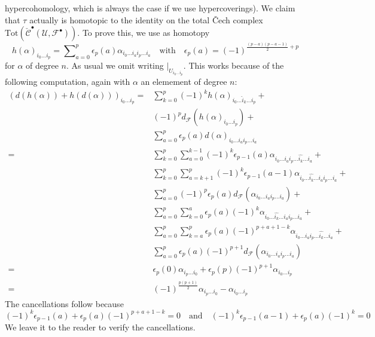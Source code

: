 hypercohomology, which is always the case if we use hypercoverings).
We claim that $\tau$ actually is homotopic to the identity on the
total {\v C}ech complex
$\text{Tot}(\check{\mathcal{C}}^\bullet({\mathcal U}, {\mathcal F}^\bullet))$.
To prove this, we use as homotopy
$$
h(\alpha)_{i_0 \ldots i_p}
=
\sum\nolimits_{a = 0}^p
\epsilon_p(a)
\alpha_{i_0 \ldots i_a i_p \ldots i_a}
\quad\text{with}\quad
\epsilon_p(a) = (-1)^{\frac{(p - a)(p - a - 1)}{2} + p}
$$
for $\alpha$ of degree $n$. As usual we omit writing
$|_{U_{i_0 \ldots i_p}}$. This works
because of the following computation, again with
$\alpha$ an elemement of degree $n$:
\begin{align*}
(d(h(\alpha)) + h(d(\alpha)))_{i_0 \ldots i_p}
= &
\sum\nolimits_{k = 0}^p
(-1)^k
h(\alpha)_{i_0 \ldots \hat i_k \ldots i_p}
+ \\
&
(-1)^p
d_{\mathcal F}(h(\alpha)_{i_0 \ldots i_p})
+ \\
&
\sum\nolimits_{a = 0}^p
\epsilon_p(a)
d(\alpha)_{i_0 \ldots i_a i_p \ldots i_a}
\\
= &
\sum\nolimits_{k = 0}^p
\sum\nolimits_{a = 0}^{k - 1}
(-1)^k \epsilon_{p - 1}(a)
\alpha_{i_0 \ldots i_a i_p \ldots \hat{i_k} \ldots i_a}
+ \\
&
\sum\nolimits_{k = 0}^p
\sum\nolimits_{a = k + 1}^p
(-1)^k \epsilon_{p - 1}(a - 1)
\alpha_{i_0 \ldots \hat{i_k} \ldots i_a i_p \ldots i_a}
+ \\
&
\sum\nolimits_{a = 0}^p
(-1)^p \epsilon_p(a)
d_{\mathcal F}(\alpha_{i_0 \ldots i_a i_p \ldots i_a})
+ \\
&
\sum\nolimits_{a = 0}^p
\sum\nolimits_{k = 0}^a
\epsilon_p(a) (-1)^k
\alpha_{i_0 \ldots \hat{i_k} \ldots i_a i_p \ldots i_a}
+ \\
&
\sum\nolimits_{a = 0}^p
\sum\nolimits_{k = a}^p
\epsilon_p(a) (-1)^{p + a + 1 - k}
\alpha_{i_0 \ldots i_a i_p \ldots \hat{i_k} \ldots i_a}
+ \\
&
\sum\nolimits_{a = 0}^p
\epsilon_p(a) (-1)^{p + 1}
d_{\mathcal F}(\alpha_{i_0 \ldots i_a i_p \ldots i_a})
\\
= &
\epsilon_p(0) \alpha_{i_p \ldots i_0} +
\epsilon_p(p) (-1)^{p + 1} \alpha_{i_0 \ldots i_p} \\
= &
(-1)^{\frac{p(p + 1)}{2}}\alpha_{i_p \ldots i_0}
- \alpha_{i_0 \ldots i_p}
\end{align*}
The cancellations follow because
$$
(-1)^k \epsilon_{p - 1}(a) + \epsilon_p(a)(-1)^{p + a + 1 - k} = 0
\quad\text{and}\quad
(-1)^k\epsilon_{p - 1}(a - 1) + \epsilon_p(a) (-1)^k = 0
$$
We leave it to the reader to verify the cancellations.


